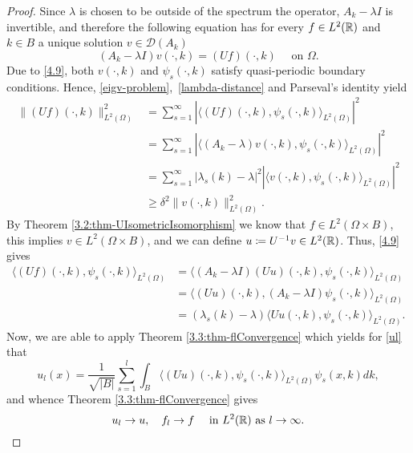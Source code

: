 \begin{theorem}
\begin{proof}
		Since $\lambda$ is chosen to be outside of the spectrum the operator, $A_{k} - \lambda I$ is invertible, and therefore the following equation has for every $f \in L^{2}(\mathbb{R})$ and $k \in B$ a unique solution $v \in \mathcal{D}(A_{k})$
		\begin{equation}
			(A_{k} - \lambda I) v(\cdot, k) = (Uf)(\cdot, k) \quad \text{ on } \Omega. \label{4.9}			
		\end{equation}
		Due to \eqref{4.9}, both $v(\cdot, k)$ and $\psi_{s}(\cdot, k)$ satisfy quasi-periodic boundary conditions. Hence, \eqref{eigv-problem}, \eqref{lambda-distance} and Parseval's identity yield
		\begin{align*}
			\| (Uf)(\cdot, k)\|^{2}_{L^{2}(\Omega)} & = \sum_{s=1}^{\infty} |\langle (Uf)(\cdot, k), \psi_{s}(\cdot, k)\rangle_{L^{2}(\Omega)}|^{2} \\
			& = \sum_{s=1}^{\infty}|\langle (A_{k} - \lambda) v(\cdot, k), \psi_{s}(\cdot, k)\rangle_{L^{2}(\Omega)}|^{2} \\
			& = \sum_{s=1}^{\infty} |\lambda_{s}(k) - \lambda|^{2} |\langle v(\cdot, k), \psi_{s}(\cdot, k)\rangle_{L^{2}(\Omega)}|^{2} \\
			& \geq \delta^{2} \| v(\cdot, k)\|^{2}_{L^{2}(\Omega)}.
		\end{align*}
		By Theorem \ref{3.2:thm-UIsometricIsomorphism} we know that $f \in L^{2}(\Omega \times B)$, this implies $v \in L^{2}(\Omega \times B)$, and we can define $u \coloneqq U^{-1} v \in L^{2}(\mathbb{R})$. Thus, \eqref{4.9} gives
			\begin{align*}
				\langle (Uf)(\cdot, k), \psi_{s}(\cdot, k) \rangle_{L^{2}(\Omega)} & = \langle (A_{k} - \lambda I)(Uu)(\cdot, k), \psi_{s}(\cdot, k) \rangle_{L^{2}(\Omega)} \\
					& = \langle (Uu)(\cdot,k), (A_{k} - \lambda I) \psi_{s}(\cdot, k) \rangle_{L^{2}(\Omega)} \\
					& = (\lambda_{s}(k) - \lambda) \langle Uu(\cdot, k), \psi_{s}(\cdot, k) \rangle_{L^{2}(\Omega)}.
			\end{align*}
		Now, we are able to apply Theorem \ref{3.3:thm-flConvergence} which yields for \eqref{ul} that
			\[ u_{l}(x) = \frac{1}{\sqrt{|B|}} \sum_{s=1}^{l} \int_{B} \langle (Uu)(\cdot, k), \psi_{s}(\cdot, k)\rangle_{L^{2}(\Omega)} \psi_{s}(x, k) dk, \]
		and whence Theorem \ref{3.3:thm-flConvergence} gives
			\begin{equation}
				u_{l} \rightarrow u, \quad f_{l} \rightarrow f \quad \text{ in } L^{2}(\mathbb{R}) \text{ as } l \rightarrow \infty. \label{ulflconvergence}
			\end{equation}

\end{proof}
\end{theorem}
